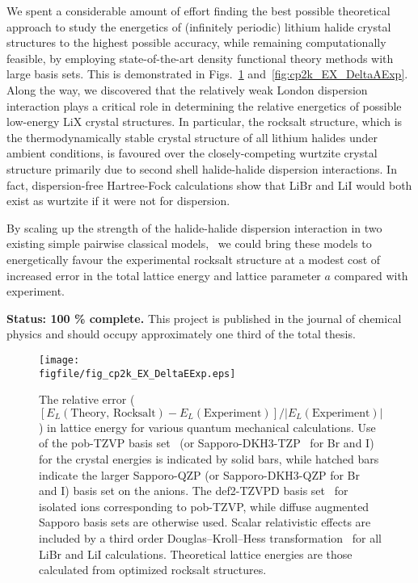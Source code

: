 \documentclass[titlepage,11pt]{article}
\newcommand{\figfile}{./figures}
\begin{document}
We spent a considerable amount of effort finding the best possible theoretical approach to study the energetics of (infinitely periodic) lithium halide crystal structures to the highest possible accuracy, while remaining computationally feasible, by employing state-of-the-art density functional theory methods with large basis sets. This is demonstrated in Figs.~\ref{fig:cp2k_EX_DeltaEExp} and~\ref{fig:cp2k_EX_DeltaAExp}. Along the way, we discovered that the relatively weak London dispersion interaction plays a critical role in determining the relative energetics of possible low-energy LiX crystal structures. In particular, the rocksalt structure, which is the thermodynamically stable crystal structure of all lithium halides under ambient conditions, is favoured over the closely-competing wurtzite crystal structure primarily due to second shell halide-halide dispersion interactions. In fact, dispersion-free Hartree-Fock calculations show that LiBr and LiI would both exist as wurtzite if it were not for dispersion.

By scaling up the strength of the halide-halide dispersion interaction in two existing simple pairwise classical models,~\cite{Fumi1964,Tosi1964,Joung2008} we could bring these models to energetically favour the experimental rocksalt structure at a modest cost of increased error in the total lattice energy and lattice parameter $a$ compared with experiment.

\textbf{Status: 100 \% complete.} This project is published in the journal of chemical physics\cite{scheiber2021analysis} and should occupy approximately one third of the total thesis.

\begin{figure}
	\texttt{[image: \\figfile/fig\_cp2k\_EX\_DeltaEExp.eps]}
	\caption{\label{fig:cp2k_EX_DeltaEExp} The relative error ($[E_{L}(\text{Theory, Rocksalt}) - E_{L}(\text{Experiment}) ] / | E_{L}(\text{Experiment}) |$) in lattice energy for various quantum mechanical calculations. Use of the pob-TZVP basis set~\cite{Peintinger2013} (or Sapporo-DKH3-TZP~\cite{sekiya2001contracted,noro2009relativistic} for Br and I) for the crystal energies is indicated by solid bars, while hatched bars indicate the larger Sapporo-QZP (or Sapporo-DKH3-QZP for Br and I) basis set on the anions. The def2-TZVPD basis set~\cite{weigend2005balanced} for isolated ions corresponding to pob-TZVP, while diffuse augmented Sapporo basis sets are otherwise used. Scalar relativistic effects are included by a third order Douglas–Kroll–Hess transformation~\cite{douglas1974quantum,hess1985applicability,nakajima2012douglas} for all LiBr and LiI calculations. Theoretical lattice energies are those calculated from optimized rocksalt structures.}
\end{figure}
\end{document}
